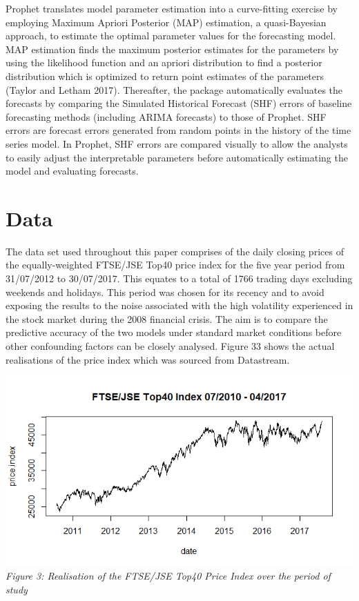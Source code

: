 \documentclass[12pt,a4paper]{article}
\numberwithin{equation}{section}
\numberwithin{figure}{section}
\numberwithin{table}{section}
\begin{document}
Prophet translates model parameter estimation into a curve-fitting
exercise by employing Maximum Apriori Posterior (MAP) estimation, a
quasi-Bayesian approach, to estimate the optimal parameter values for
the forecasting model. MAP estimation finds the maximum posterior
estimates for the parameters by using the likelihood function and an
apriori distribution to find a posterior distribution which is optimized
to return point estimates of the parameters (Taylor and Letham 2017).
Thereafter, the package automatically evaluates the forecasts by
comparing the Simulated Historical Forecast (SHF) errors of baseline
forecasting methods (including ARIMA forecasts) to those of Prophet. SHF
errors are forecast errors generated from random points in the history
of the time series model. In Prophet, SHF errors are compared visually
to allow the analysts to easily adjust the interpretable parameters
before automatically estimating the model and evaluating forecasts.

\section{Data}\label{data}

The data set used throughout this paper comprises of the daily closing
prices of the equally-weighted FTSE/JSE Top40 price index for the five
year period from 31/07/2012 to 30/07/2017. This equates to a total of
1766 trading days excluding weekends and holidays. This period was
chosen for its recency and to avoid exposing the results to the noise
associated with the high volatility experienced in the stock market
during the 2008 financial crisis. The aim is to compare the predictive
accuracy of the two models under standard market conditions before other
confounding factors can be closely analysed. Figure 33 shows the actual
realisations of the price index which was sourced from Datastream.

\includegraphics[width=1.00000\textwidth]{plot of Price index.png}\\
\emph{Figure 3: Realisation of the FTSE/JSE Top40 Price Index over the
period of study}
\end{document}
